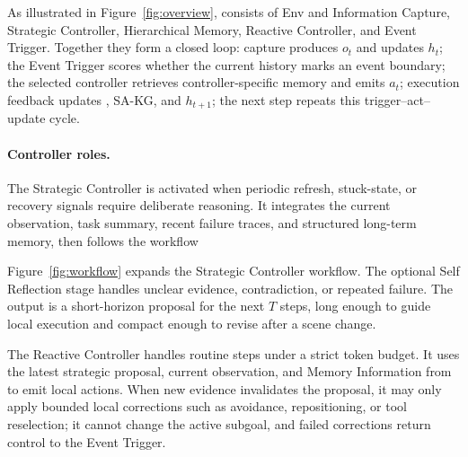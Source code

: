 As illustrated in Figure~\mbox{\ref{fig:overview}}, \method{} consists of Env
and Information Capture, Strategic Controller, Hierarchical Memory, Reactive
Controller, and Event Trigger. Together they form a closed loop:
capture produces $o_t$ and updates $h_t$; the Event Trigger scores whether the
current history marks an event boundary; the selected controller retrieves
controller-specific memory and emits $a_t$; execution feedback updates
\samb{}, SA-KG, and $h_{t+1}$; the next step repeats this trigger--act--update
cycle.
\vspace{-0.35em}

\paragraph{Controller roles.}
The Strategic Controller is activated when periodic refresh, stuck-state, or
recovery signals require deliberate reasoning. It integrates the current
observation, task summary, recent failure traces, and structured long-term
memory, then follows the workflow
\begin{center}
\begingroup
\vspace{-0.35em}

\vspace{-0.35em}

\endgroup
\end{center}
Figure~\mbox{\ref{fig:workflow}} expands the Strategic Controller workflow. The
optional Self Reflection stage handles unclear evidence, contradiction, or
repeated failure. The output is a short-horizon proposal for the next $T$ steps,
long enough to guide local execution and compact enough to revise after a scene
change.

The Reactive Controller handles routine steps under a strict token budget. It
uses the latest strategic proposal, current observation, and Memory Information
from \samb{} to emit local actions. When new evidence invalidates the proposal,
it may only apply bounded local corrections such as avoidance, repositioning, or
tool reselection; it cannot change the active subgoal, and failed corrections
return control to the Event Trigger.

